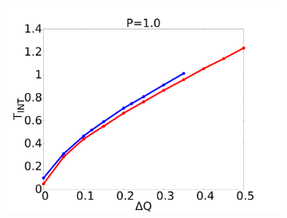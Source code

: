 \documentclass{beamer}
\begin{document}
\begin{frame}
\begin{figure}
\begin{center}
\begin{subfigure}[t]{0.3\textwidth}
            \includegraphics[scale=0.11]{../images/p1_int.pdf}
        \end{subfigure} 
    \end{center}
\end{figure}
\end{frame}
\end{document}
